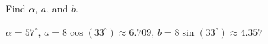 {Find $\alpha$, $a$, and $b$.

\begin{center}
\end{center}}
{$\alpha = 57^{\circ}$, $a = 8 \cos(33^{\circ}) \approx 6.709$, $b = 8 \sin(33^{\circ}) \approx 4.357$}